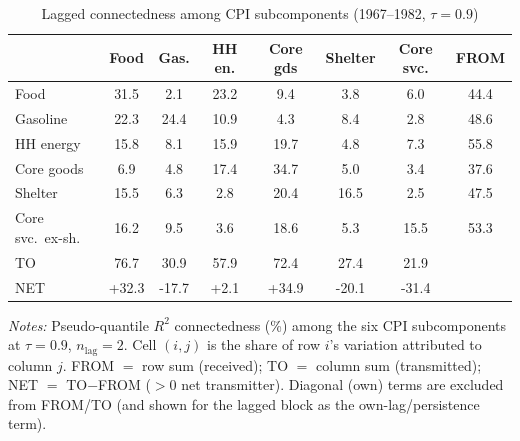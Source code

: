 \begin{table}[!ht]
\centering
\caption{Lagged connectedness among CPI subcomponents (1967--1982, $\tau=0.9$)}
\label{tab:connlgi}
\setlength{\tabcolsep}{4pt}\footnotesize
\begin{threeparttable}
\begin{tabular}{l c c c c c c c}
\toprule
 & Food & Gas. & HH en. & Core gds & Shelter & Core svc. & FROM \\
\midrule
Food & 31.5 & 2.1 & 23.2 & 9.4 & 3.8 & 6.0 & 44.4 \\
Gasoline & 22.3 & 24.4 & 10.9 & 4.3 & 8.4 & 2.8 & 48.6 \\
HH energy & 15.8 & 8.1 & 15.9 & 19.7 & 4.8 & 7.3 & 55.8 \\
Core goods & 6.9 & 4.8 & 17.4 & 34.7 & 5.0 & 3.4 & 37.6 \\
Shelter & 15.5 & 6.3 & 2.8 & 20.4 & 16.5 & 2.5 & 47.5 \\
Core svc.\ ex-sh. & 16.2 & 9.5 & 3.6 & 18.6 & 5.3 & 15.5 & 53.3 \\
\midrule
TO & 76.7 & 30.9 & 57.9 & 72.4 & 27.4 & 21.9 &  \\
NET & +32.3 & -17.7 & +2.1 & +34.9 & -20.1 & -31.4 &  \\
\bottomrule
\end{tabular}
\begin{tablenotes}[flushleft]\footnotesize
\item \textit{Notes:} Pseudo-quantile $R^2$ connectedness (\%) among the six CPI subcomponents at $\tau=0.9$, $n_{\text{lag}}=2$. Cell $(i,j)$ is the share of row $i$'s variation attributed to column $j$. FROM $=$ row sum (received); TO $=$ column sum (transmitted); NET $=$ TO$-$FROM ($>0$ net transmitter). Diagonal (own) terms are excluded from FROM/TO (and shown for the lagged block as the own-lag/persistence term).
\end{tablenotes}
\end{threeparttable}
\end{table}

